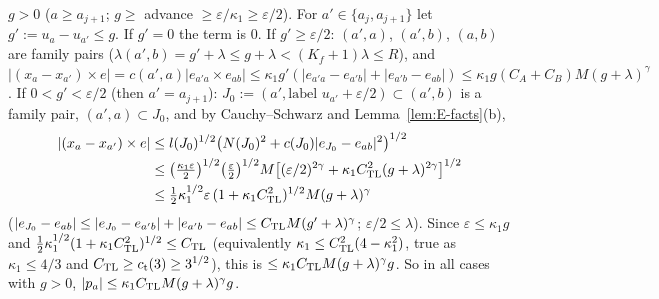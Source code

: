 \emph{$g>0$} ($a\ge a_{j+1}$; $g\ge$ advance $\ge\varepsilon/\kappa_1\ge\varepsilon/2$). For $a'\in\{a_j,a_{j+1}\}$ let
$g':=u_a-u_{a'}\le g$. If $g'=0$ the term is $0$. If $g'\ge\varepsilon/2$: $(a',a)$, $(a',b)$, $(a,b)$ are family pairs
($\lambda(a',b)=g'+\lambda\le g+\lambda<(K_f+1)\lambda\le R$), and
$|(x_a-x_{a'})\times e|=c(a',a)|e_{a'a}\times e_{ab}|\le\kappa_1g'(|e_{a'a}-e_{a'b}|+|e_{a'b}-e_{ab}|)\le\kappa_1g(C_A+C_B)M(g+\lambda)^\gamma$.
If $0<g'<\varepsilon/2$ (then $a'=a_{j+1}$): $J_0:=(a',\text{label }u_{a'}+\varepsilon/2)\subset(a',b)$ is a family pair,
$(a',a)\subset J_0$, and by Cauchy--Schwarz and Lemma~\ref{lem:E-facts}(b),
\begin{align*}
|(x_a-x_{a'})\times e|&\le l(J_0)^{1/2}\bigl(N(J_0)^2+c(J_0)|e_{J_0}-e_{ab}|^2\bigr)^{1/2}\\
&\le\bigl(\tfrac{\kappa_1\varepsilon}2\bigr)^{1/2}\bigl(\tfrac\varepsilon2\bigr)^{1/2}M\bigl[(\varepsilon/2)^{2\gamma}
+\kappa_1C_{\mathrm{TL}}^2(g+\lambda)^{2\gamma}\bigr]^{1/2}\\
&\le\tfrac12\kappa_1^{1/2}\varepsilon\,(1+\kappa_1C_{\mathrm{TL}}^2)^{1/2}M(g+\lambda)^\gamma
\end{align*}
($|e_{J_0}-e_{ab}|\le|e_{J_0}-e_{a'b}|+|e_{a'b}-e_{ab}|\le C_{\mathrm{TL}} M(g'+\lambda)^\gamma$; $\varepsilon/2\le\lambda$). Since
$\varepsilon\le\kappa_1g$ and $\frac12\kappa_1^{1/2}(1+\kappa_1C_{\mathrm{TL}}^2)^{1/2}\le C_{\mathrm{TL}}$ (equivalently $\kappa_1\le C_{\mathrm{TL}}^2(4-\kappa_1^2)$, true
as $\kappa_1\le4/3$ and $C_{\mathrm{TL}}\ge c_{\mathrm t}(3)\ge3^{1/2}$), this is $\le\kappa_1C_{\mathrm{TL}} M(g+\lambda)^\gamma g$. So in all cases with $g>0$,
$|p_a|\le\kappa_1C_{\mathrm{TL}} M(g+\lambda)^\gamma g$.

